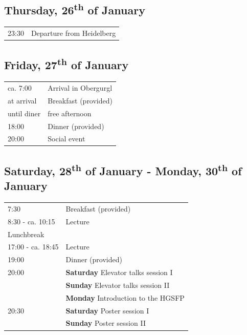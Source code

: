 
\noindent
{}

\subsection*{Thursday, 26\textsuperscript{th} of January}

\begin{tabular}{p{2.5cm}p{11.5cm}}
	23:30 & Departure from Heidelberg \\
\end{tabular}

\subsection*{Friday, 27\textsuperscript{th} of January}

\begin{tabular}{p{2.5cm}p{11.5cm}}
	ca. 7:00 & Arrival in Obergurgl \\ 
	at arrival & Breakfast (provided) \\ 
	until diner & free afternoon \\
	18:00 & Dinner (provided) \\
	20:00 & Social event \\
\end{tabular}

\subsection*{Saturday, 28\textsuperscript{th} of January - Monday, 30\textsuperscript{th} of January}

\begin{tabular}{p{2.5cm}p{6cm}}
	7:30 & Breakfast (provided) \\
	8:30 - ca. 10:15 & Lecture \\ 
	\cline{1-2}
	Lunchbreak \\
	\cline{1-2}
	17:00 - ca. 18:45 & Lecture \\ 
	19:00 & Dinner (provided) \\
	20:00 & \textbf{Saturday} Elevator talks session I \\
		  & \textbf{Sunday}  Elevator talks session II \\
		  & \textbf{Monday} Introduction to the HGSFP \\
	20:30 & \textbf{Saturday} Poster session I \\
		  & \textbf{Sunday}  Poster session II \\
		
\end{tabular}

